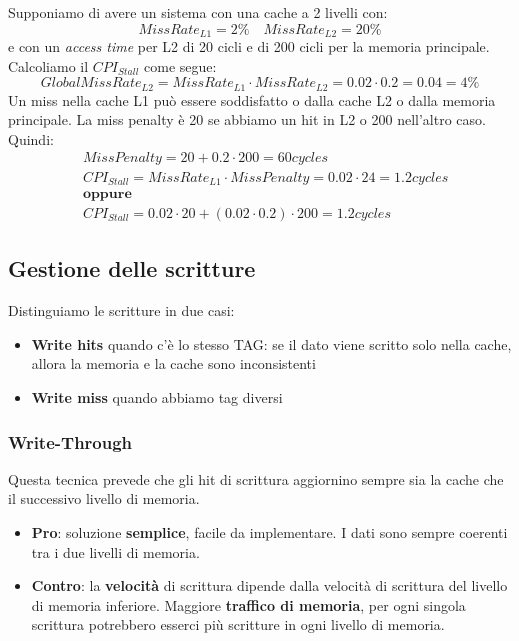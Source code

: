 \begin{example}
	Supponiamo di avere un sistema con una cache a 2 livelli con:
	\begin{equation*}
		MissRate_{L1}=2\% \quad MissRate_{L2}=20\%
	\end{equation*}
	e con un \emph{access time} per L2 di 20 cicli e di 200 cicli per la memoria principale. Calcoliamo il $CPI_{Stall}$ come segue:
	\begin{equation*}
		GlobalMissRate_{L2}=MissRate_{L1} \cdot MissRate_{L2} = 0.02 \cdot 0.2 = 0.04 = 4\%
	\end{equation*}
	Un miss nella cache L1 può essere soddisfatto o dalla cache L2 o dalla memoria principale. La miss penalty è 20 se abbiamo un hit in L2 o 200 nell'altro caso. Quindi:
	\begin{equation*}
		\begin{split}
			& MissPenalty = 20 + 0.2 \cdot 200 = 60cycles\\
			& CPI_{Stall} = MissRate_{L1} \cdot MissPenalty = 0.02 \cdot 24 = 1.2cycles \\
			& \textbf{oppure} \\
			& CPI_{Stall} = 0.02 \cdot 20 + (0.02 \cdot 0.2) \cdot 200 = 1.2cycles
		\end{split}
	\end{equation*}
\end{example}

\subsection{Gestione delle scritture}
Distinguiamo le scritture in due casi:
\begin{itemize}
	\item \textbf{Write hits} quando c'è lo stesso TAG: se il dato viene scritto solo nella cache, allora la memoria e la cache sono inconsistenti
	\item \textbf{Write miss} quando abbiamo tag diversi
\end{itemize}

\subsubsection{Write-Through}
Questa tecnica prevede che gli hit di scrittura aggiornino sempre sia la cache che il successivo livello di memoria.
\begin{itemize}
	\item \textbf{Pro}: soluzione \textbf{semplice}, facile da implementare. I dati sono sempre coerenti tra i due livelli di memoria.
	\item \textbf{Contro}: la \textbf{velocità} di scrittura dipende dalla velocità di scrittura del livello di memoria inferiore. Maggiore \textbf{traffico di memoria}, per ogni singola scrittura potrebbero esserci più scritture in ogni livello di memoria.
\end{itemize}

